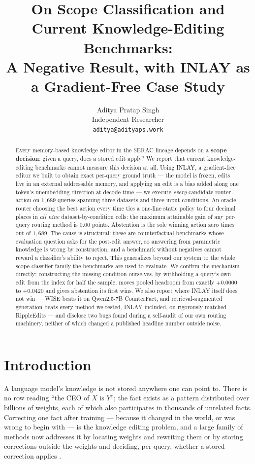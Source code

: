 \documentclass[11pt]{article}
\title{On Scope Classification and Current Knowledge-Editing Benchmarks:\\
A Negative Result, with INLAY as a Gradient-Free Case Study}
\author{Aditya Pratap Singh \\
  Independent Researcher \\
  \texttt{aditya@adityaps.work}}
\begin{document}
\maketitle

\begin{abstract}
Every memory-based knowledge editor in the SERAC lineage depends on a
\textbf{scope decision}: given a query, does a stored edit apply? We report
that current knowledge-editing benchmarks cannot measure this decision at
all. Using INLAY, a gradient-free editor we built to obtain exact per-query
ground truth --- the model is frozen, edits live in an external addressable
memory, and applying an edit is a bias added along one token's unembedding
direction at decode time --- we execute \emph{every} candidate router action
on $1{,}689$ queries spanning three datasets and three input conditions. An
oracle router choosing the best action every time ties a one-line static
policy to four decimal places in \emph{all nine} dataset-by-condition cells:
the maximum attainable gain of any per-query routing method is $0.00$ points.
Abstention is the sole winning action zero times out of $1{,}689$. The cause
is structural: these are counterfactual benchmarks whose evaluation question
asks for the post-edit answer, so answering from parametric knowledge is
wrong by construction, and a benchmark without negatives cannot reward a
classifier's ability to reject. This generalizes beyond our system to the
whole scope-classifier family the benchmarks are used to evaluate. We confirm
the mechanism directly: constructing the missing condition ourselves, by
withholding a query's own edit from the index for half the sample, moves
pooled headroom from exactly $+0.0000$ to $+0.0420$ and gives abstention its
first wins. We also
report where INLAY itself does not win --- WISE beats it on Qwen2.5-7B
CounterFact, and retrieval-augmented generation beats every method we tested,
INLAY included, on rigorously matched RippleEdits --- and disclose two bugs
found during a self-audit of our own routing machinery, neither of which
changed a published headline number outside noise.
\end{abstract}

\section{Introduction}
\label{sec:intro}

A language model's knowledge is not stored anywhere one can point to. There is
no row reading ``the CEO of $X$ is $Y$''; the fact exists as a pattern
distributed over billions of weights, each of which also participates in
thousands of unrelated facts. Correcting one fact after training --- because
it changed in the world, or was wrong to begin with --- is the knowledge
editing problem, and a large family of methods now addresses it by locating
weights and rewriting them \citep{meng2022rome,meng2023memit,fang2025alphaedit}
or by storing corrections outside the weights and deciding, per query, whether
a stored correction applies \citep{mitchell2022serac,hartvigsen2023grace,wang2024wise}.
\end{document}
